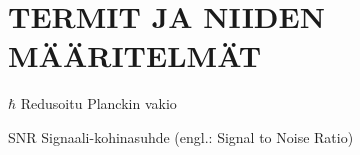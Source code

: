 \chapter*{TERMIT JA NIIDEN MÄÄRITELMÄT}

\begin{termiluettelo}

\item [$\hbar$] Redusoitu Planckin vakio
\item [SNR] Signaali-kohinasuhde (engl.: Signal to Noise Ratio)

\end{termiluettelo}
